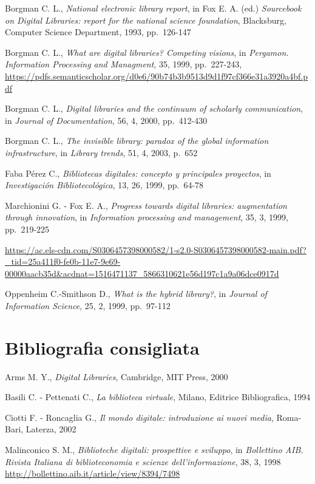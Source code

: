 \documentclass[
  b5paper,
  twoside,
  12pt,
  chapterprefix=false,
  bibliography=totocnumbered,
  parskip=false]{scrbook}
\begin{document}
Borgman C. L., \emph{National electronic library report}, in Fox E. A. (ed.)
\emph{Sourcebook on Digital Libraries: report for the national science
foundation}, Blacksburg, Computer Science Department, 1993, pp.~126-147

Borgman C. L., \emph{What are digital libraries? Competing visions}, in
\emph{Pergamon. Information Processing and Managment}, 35, 1999, pp.~227-243,
\url{https://pdfs.semanticscholar.org/d0e6/90b74b3b9513d9d1f97cf366e31a3920a4bf.pdf}

Borgman C. L., \emph{Digital libraries and the continuum of scholarly
communication}, in \emph{Journal of Documentation}, 56, 4, 2000, pp.~412-430

Borgman C. L., \emph{The invisible library: paradox of the global information
infrastructure}, in \emph{Library trends}, 51, 4, 2003, p.~652

Faba Pérez C., \emph{Bibliotecas digitales: concepto y principales
proyectos}, in \emph{Investigación Bibliotecológica}, 13, 26, 1999, pp.~64-78

Marchionini G. - Fox E. A., \emph{Progress towards digital libraries:
augmentation through innovation}, in \emph{Information processing and
management}, 35, 3, 1999, pp.~219-225

\url{https://ac.els-cdn.com/S0306457398000582/1-s2.0-S0306457398000582-main.pdf?_tid=25a411f0-fe0b-11e7-9e69-00000aacb35d\&acdnat=1516471137_5866310621e56d197c1a9a06dce0917d}

Oppenheim C.-Smithson D., \emph{What is the hybrid library?}, in \emph{Journal of
Information Science}, 25, 2, 1999, pp.~97-112

\hypertarget{bibliografia-consigliata-1}{%
\section*{Bibliografia consigliata}\label{bibliografia-consigliata-1}}

Arms M. Y., \emph{Digital Libraries}, Cambridge, MIT Press, 2000

Basili C. - Pettenati C., \emph{La biblioteca virtuale}, Milano, Editrice
Bibliografica, 1994

Ciotti F. - Roncaglia G., \emph{Il mondo digitale: introduzione ai nuovi
media}, Roma-Bari, Laterza, 2002

Malinconico S. M., \emph{Biblioteche digitali: prospettive e sviluppo}, in
\emph{Bollettino AIB. Rivista Italiana di biblioteconomia e scienze
dell'informazione}, 38, 3, 1998
\url{http://bollettino.aib.it/article/view/8394/7498}
\end{document}
